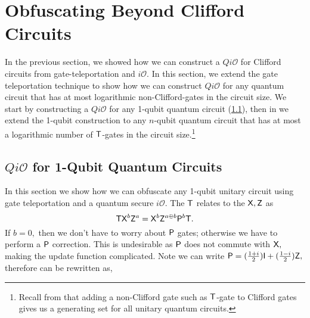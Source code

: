 
\section{Obfuscating Beyond Clifford Circuits}
\label{QiO:Clifford+T:family}
In the previous section, we showed how we can construct a $Qi\mathcal{O}$ for Clifford circuits from gate-teleportation and $i\mathcal{O}.$ In this section, we extend the gate teleportation technique to show how we can construct $Qi\mathcal{O}$ for any quantum circuit that has at most logarithmic non-Clifford-gates in the circuit size.  We start by constructing a $Qi\mathcal{O}$ for any 1-qubit quantum circuit (\cref{QiO:Clifford+T:family+GT}), then in   we extend the 1-qubit construction to any $n$-qubit quantum circuit that has at most a logarithmic number of  ${\sf T}$-gates in the circuit size.\footnote{Recall from   that adding a non-Clifford gate  such as ${\sf T}$-gate to Clifford gates gives us a generating set for all unitary quantum circuits.}



\subsection{$Qi\mathcal{O}$ for 1-Qubit Quantum Circuits}
\label{QiO:Clifford+T:family+GT}
In this section we show how we can obfuscate any 1-qubit unitary circuit using gate teleportation and a quantum secure $i\mathcal{O}.$  The ${\sf T}$ relates to the ${\sf X}, {\sf Z}$ as
\begin{equation}
\label{eq:pgate}
{\sf T} {\sf X}^b {\sf Z}^a={\sf X}^b {\sf Z}^{a\oplus b}{\sf P}^b {\sf T}.
\end{equation}
If $b=0,$ then we don't have to worry about ${\sf P}$ gates; otherwise we have to perform a ${\sf P}$ correction. This is undesirable as ${\sf P}$ does not commute with ${\sf X},$ making the update function complicated. Note we can write ${\sf P}=(\frac{1+i}{2}) {\sf I} + (\frac{1-i}{2}){\sf Z},$ therefore   can be rewritten as,

